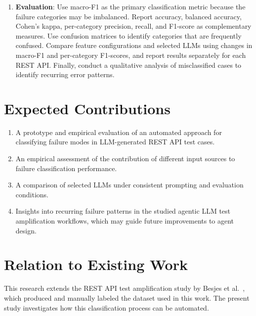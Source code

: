 \documentclass[12pt, a4paper]{article}
\begin{document}
\begin{enumerate}[leftmargin=1.5em, itemsep=4pt]
  \item \textbf{Evaluation}: Use macro-F1 as the primary classification
metric because the failure categories may be imbalanced. Report accuracy,
balanced accuracy, Cohen's kappa, per-category precision, recall, and
F1-score as complementary measures. Use confusion matrices to identify
categories that are frequently confused. Compare feature configurations
and selected LLMs using changes in macro-F1 and per-category F1-scores,
and report results separately for each REST API. Finally, conduct a
qualitative analysis of misclassified cases to identify recurring error
patterns.

\end{enumerate}

\section{Expected Contributions}

\begin{enumerate}[leftmargin=1.5em, itemsep=4pt]

    \item A prototype and empirical evaluation of an automated approach
    for classifying failure modes in LLM-generated REST API test cases.

    \item An empirical assessment of the contribution of different input
    sources to failure classification performance.

    \item A comparison of selected LLMs under consistent prompting and
    evaluation conditions.

    \item Insights into recurring failure patterns in the studied agentic
    LLM test amplification workflows, which may guide future improvements
    to agent design.

\end{enumerate}


\section{Relation to Existing Work}

This research extends the REST API test amplification study by
Besjes et al.~\cite{besjes2025agentic}, which produced and manually
labeled the dataset used in this work. The present study investigates
how this classification process can be automated.
\end{document}
